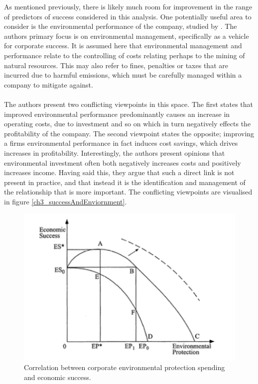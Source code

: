 {As mentioned previously, there is likely much room for improvement in the range of predictors of success considered in this analysis. One potentially useful area to consider is the environmental performance of the company, studied by \cite{schaltegger2002link}. The authors primary focus is on environmental management, specifically as a vehicle for corporate success. It is assumed here that environmental management and performance relate to the controlling of costs relating perhaps to the mining of natural resources. This may also refer to fines, penalties or taxes that are incurred due to harmful emissions, which must be carefully managed within a company to mitigate against. \\\\
The authors present two conflicting viewpoints in this space. The first states that improved environmental performance predominantly causes an increase in operating costs, due to investment and so on which in turn negatively effects the profitability of the company. The second viewpoint states the opposite; improving a firms environmental performance in fact induces cost savings, which drives increases in profitability. Interestingly, the authors present opinions that environmental investment often both negatively increases costs and positively increases income. Having said this, they argue that such a direct link is not present in practice, and that instead it is the identification and management of the relationship that is more important. The conflicting viewpoints are visualised in figure \ref{ch3_successAndEnviornment}. 
\begin{figure}[h] 
\centering
\includegraphics[scale = 0.7]{images/ch3_successAndEnviornment.png}
\caption{Correlation between corporate environmental protection spending and economic success.}

\end{figure}}
